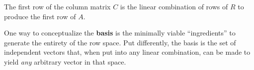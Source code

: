 \documentclass[a4paper]{article}
\begin{document}
\vspace{12pt}


The first row of the column matrix \(C\) is the linear combination of rows of \(R\) to produce the first row of \(A\).

\vspace{12pt}


One way to conceptualize the \textbf{basis} is the minimally viable ``ingredients'' to generate the entirety of the row space. Put differently, the basis is the set of independent vectors that, when put into any linear combination, can be made to yield \textit{any} arbitrary vector in that space. 
\end{document}
